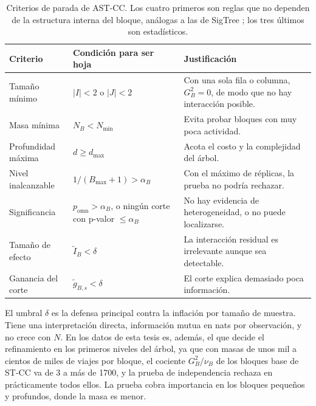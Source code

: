 \begin{table}[t]
\centering
\small
\begin{tabular}{>{\raggedright\arraybackslash}p{}>{\raggedright\arraybackslash}p{}>{\raggedright\arraybackslash}p{}}
\toprule
Criterio & Condición para ser hoja & Justificación \\
\midrule
Tamaño mínimo & $|I|<2$ o $|J|<2$ & Con una sola fila o columna, $G^2_B=0$, de modo que no hay interacción posible. \\
Masa mínima & $N_B<N_{\min}$ & Evita probar bloques con muy poca actividad. \\
Profundidad máxima & $d\ge d_{\max}$ & Acota el costo y la complejidad del árbol. \\
Nivel inalcanzable & $1/(B_{\max}+1)>\alpha_B$ & Con el máximo de réplicas, la prueba no podría rechazar. \\
Significancia & $p_{\mathrm{omn}}>\alpha_B$, o ningún corte con p-valor $\le\alpha_B$ & No hay evidencia de heterogeneidad, o no puede localizarse. \\
Tamaño de efecto & $\tilde I_B<\delta$ & La interacción residual es irrelevante aunque sea detectable. \\
Ganancia del corte & $\tilde g_{B,s}<\delta$ & El corte explica demasiado poca información. \\
\bottomrule
\end{tabular}
\caption{Criterios de parada de AST-CC. Los cuatro primeros son reglas que no
dependen de la estructura interna del bloque, análogas a las de SigTree \cite{Hu2025}; los
tres últimos son estadísticos.}
\label{tab:prop-parada}
\end{table}

El umbral $\delta$ es la defensa principal contra la inflación por tamaño de
muestra. Tiene una interpretación directa, información mutua en nats por
observación, y no crece con $N$. En los datos de esta tesis es, además, el que
decide el refinamiento en los primeros niveles del árbol, ya que con masas de unos mil
a cientos de miles de viajes por bloque, el cociente $G^2_B/\nu_B$ de los
bloques base de ST-CC va de 3 a más de 1700, y la prueba de independencia
rechaza en prácticamente todos ellos. La prueba cobra importancia en los bloques
pequeños y profundos, donde la masa es menor.


